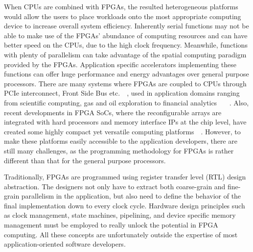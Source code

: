 When CPUs are combined with FPGAs,
the resulted heterogeneous platforms would allow the users to place workloads onto the most appropriate
computing device to increase overall system efficiency.
Inherently serial functions may not be able to make use of the FPGAs' abundance of computing resources and can have better speed on the CPUs, due to the high clock frequency.
Meanwhile, functions with plenty of parallelism can take advantage of the
spatial computing paradigm provided by the FPGAs.
Application specific accelerators implementing these functions can offer
huge performance and energy advantages over general purpose
processors. There are many systems where FPGAs are coupled to CPUs through PCIe interconnect, Front Side Bus etc.~\cite{nallatech510T}~\cite{maxeler},
used in application domains ranging from scientific computing, gas and oil exploration to financial analytics
~\cite{smith2005scientific}~\cite{5719584}~\cite{6299067}.
Also, recent developments in FPGA SoCs, where the reconfigurable arrays are  integrated with hard processors and memory interface IPs at the chip level,
have created some highly compact yet versatile computing platforms~\cite{chips:zynq}~\cite{chips:cyclonesoc}. 
However, to make these platforms easily accessible to the application developers, there are still many challenges,
as the programming methodology for FPGAs is rather different than that for the general purpose processors.

Traditionally, FPGAs are programmed using register transfer level (RTL) design
abstraction. The designers not only have to extract both coarse-grain and fine-grain parallelism in the
application, but also
need to define the behavior of the final implementation down to every clock cycle.
Hardware design principles such as clock management, state machines,
pipelining, and device specific memory management must be employed to really unlock the potential
in FPGA computing. All these concepts are unfortunately outside the expertise of most application-oriented
software developers. 

